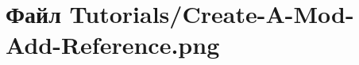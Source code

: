 \hypertarget{_create-_a-_mod-_add-_reference_8png}{}\section{Файл Tutorials/\+Create-\/\+A-\/\+Mod-\/\+Add-\/\+Reference.png}
\label{_create-_a-_mod-_add-_reference_8png}
